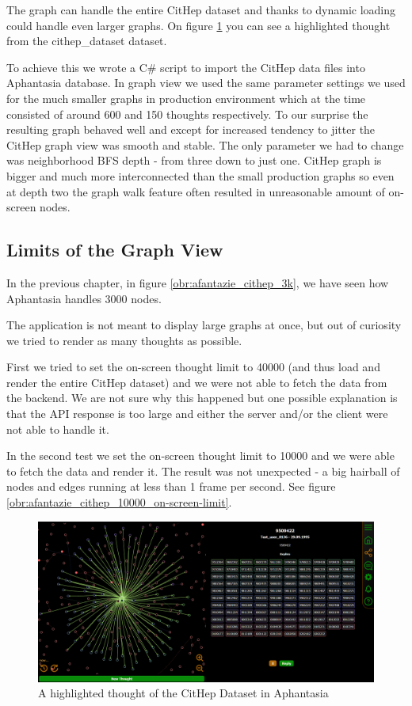 The graph can handle the entire CitHep dataset and thanks to dynamic loading could handle even larger graphs.
On figure \ref{obr:afantazie_cithep_highlighted_thought} you can see a highlighted thought from the \gls{cithep_dataset} dataset.

To achieve this we wrote a C\# script to import the CitHep data files into Aphantasia database.
In graph view we used the same parameter settings we used for the much smaller graphs in \gls{production} environment
which at the time consisted of around 600 and 150 thoughts respectively.
To our surprise the resulting graph behaved well and except for increased tendency to jitter the CitHep graph view was smooth and stable.
The only parameter we had to change was neighborhood \gls{BFS} depth - from three down to just one.
CitHep graph is bigger and much more interconnected than the small production graphs so even at depth two
the graph walk feature often resulted in unreasonable amount of on-screen nodes.

\subsection{Limits of the Graph View}

In the previous chapter, in figure \ref{obr:afantazie_cithep_3k}, we have seen how Aphantasia handles 3000 nodes. 

The application is not meant to display large graphs at once, but out of curiosity we tried to render as many thoughts as possible.

First we tried to set the on-screen thought limit to 40000 (and thus load and render the entire CitHep dataset) and we were not able to fetch the data from the backend.
We are not sure why this happened but one possible explanation is that the API response is too large and either the server and/or the client were not able to handle it.

In the second test we set the on-screen thought limit to 10000 and we were able to fetch the data and render it.
The result was not unexpected - a big hairball of nodes and edges running at less than 1 frame per second.
See figure \ref{obr:afantazie_cithep_10000_on-screen-limit}.


\begin{figure}[p]
    \includegraphics[width=130mm, keepaspectratio]{img/afantazie_cithep_highlighted_thought.png}
    \caption{A highlighted thought of the CitHep Dataset in Aphantasia}
    \label{obr:afantazie_cithep_highlighted_thought}
\end{figure}

